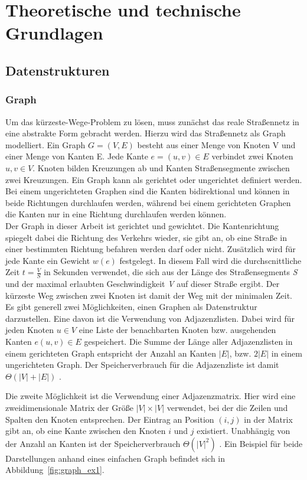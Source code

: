 \section{Theoretische und technische Grundlagen}

\subsection{Datenstrukturen}
\subsubsection{Graph}
Um das kürzeste-Wege-Problem zu lösen, muss zunächst das reale Straßennetz in eine abstrakte Form
gebracht werden. Hierzu wird das Straßennetz als Graph modelliert. Ein Graph $G = (V,E)$ besteht aus
einer Menge von Knoten V und einer Menge von Kanten E. Jede Kante $e = (u,v)\in E$ verbindet zwei
Knoten $u,v \in V$. Knoten bilden Kreuzungen ab und Kanten Straßensegmente zwischen zwei Kreuzungen.
Ein Graph kann als gerichtet oder ungerichtet definiert werden. Bei einem ungerichteten  Graphen
sind die Kanten bidirektional und können in beide Richtungen durchlaufen werden, während bei einem
gerichteten Graphen die Kanten nur in eine Richtung durchlaufen werden können.\\

Der Graph in dieser Arbeit ist gerichtet und gewichtet. Die Kantenrichtung spiegelt dabei die
Richtung des Verkehrs wieder, \dH sie gibt an, ob eine Straße in einer bestimmten Richtung befahren
werden darf oder nicht. Zusätzlich wird für jede Kante ein Gewicht $w(e)$ festgelegt. In diesem Fall
wird die durchscnittliche Zeit $t = \frac{V}{S}$ in Sekunden verwendet, die  sich aus der Länge des
Straßensegments \emph{S} und der maximal erlaubten Geschwindigkeit \emph{V} auf dieser Straße
ergibt. Der kürzeste Weg zwischen zwei Knoten ist damit der Weg mit der minimalen Zeit.\\

Es gibt generell zwei Möglichkeiten, einen Graphen als Datenstruktur darzustellen. Eine davon ist
die Verwendung von Adjazenzlisten. Dabei wird für jeden Knoten $u \in V$ eine Liste der benachbarten
Knoten bzw. ausgehenden Kanten $e(u,v) \in E$ gespeichert. Die Summe der Länge aller Adjazenzlisten
in einem gerichteten Graph entspricht der Anzahl an Kanten $|E|$, bzw. $2|E|$ in einem ungerichteten
Graph. Der Speicherverbrauch für die Adjazenzliste ist damit $\Theta(|V| + |E|)$ \cite{intro.algo}.

Die zweite Möglichkeit ist die Verwendung einer Adjazenzmatrix. Hier wird eine zweidimensionale
Matrix der Größe $|V| \times |V|$ verwendet, bei der die Zeilen und Spalten den Knoten entsprechen.
Der Eintrag an Position $(i,j)$ in der Matrix gibt an, ob eine Kante zwischen den Knoten $i$ und $j$
existiert. Unabhängig von der Anzahl an Kanten ist der Speicherverbrauch $\Theta(|V|^2)$
\cite{intro.algo}. Ein Beispiel für beide Darstellungen anhand eines einfachen Graph befindet sich
in Abbildung~\ref{fig:graph_ex1}.\\

